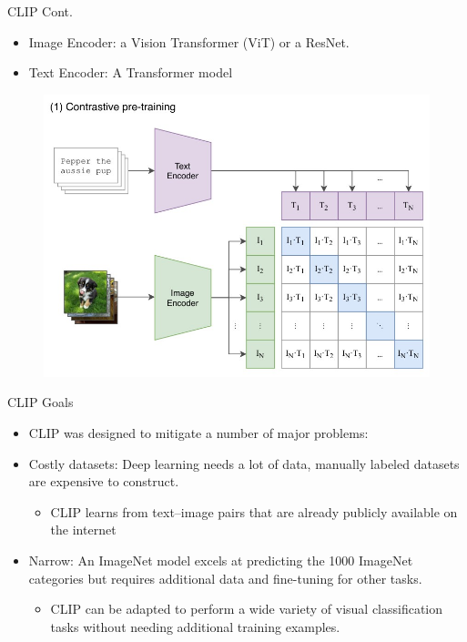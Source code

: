 \documentclass[serif, aspectratio=169]{beamer}
\begin{document}
\begin{frame}{CLIP Cont.}
\begin{itemize}
\item Image Encoder: a Vision Transformer (ViT) or a ResNet.
\item Text Encoder: A Transformer model 
\end{itemize}
\begin{figure}[hb]
        \begin{center}
            \includegraphics[keepaspectratio, scale=0.5]{pic/clip-overview.jpg}
        \end{center}
    \end{figure}
\end{frame}


\begin{frame}{CLIP Goals}
\begin{itemize}
\item CLIP was designed to mitigate a number of major problems:
\item Costly datasets: Deep learning needs a lot of data, manually labeled datasets are expensive to construct.
\begin{itemize}
\item CLIP learns from text–image pairs that are already publicly available on the internet
\end{itemize}
\item Narrow: An ImageNet model excels at predicting the 1000 ImageNet categories but requires additional data and fine-tuning for other tasks. 

\begin{itemize}
\item CLIP can be adapted to perform a wide variety of visual classification tasks without needing additional training examples. 
\end{itemize}
\end{itemize}

\end{frame}
\end{document}
